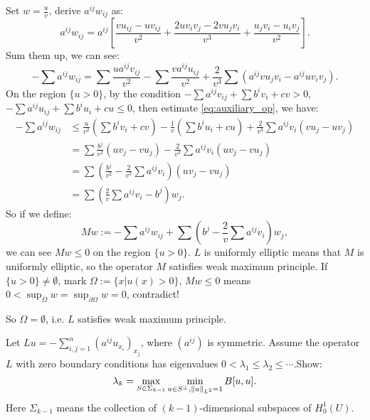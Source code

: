 \begin{solution}
    Set $w=\frac{u}{v}$, derive $a^{ij}w_{ij}$ as:
    \begin{equation}
        a^{ij}w_{ij}=a^{ij}\left[\frac{vu_{ij}-uv_{ij}}{v^2}+\frac{2uv_{i}v_{j}-2vu_{j}v_{i}}{v^3}+\frac{u_{j}v_{i}-u_{i}v_{j}}{v^2}\right].
    \end{equation}
    Sum them up, we can see:
    \begin{equation}
        \label{eq:auxiliary_op}
        -\sum a^{ij}w_{ij}=\sum\frac{ua^{ij}v_{ij}}{v^2}-\sum\frac{va^{ij}u_{ij}}{v^2}+\frac{2}{v^3}\sum\left(a^{ij}vu_{j}v_{i}-a^{ij}uv_{i}v_{j}\right).
    \end{equation}
    On the region $\{u>0\}$, by the condition $-\sum a^{ij}v_{ij}+\sum b^{i}v_{i}+cv>0$, $-\sum a^{ij}u_{ij}+\sum b^{i}u_{i}+cu\le 0$, then estimate \eqref{eq:auxiliary_op}, we have:
    \begin{equation}
        \begin{aligned}
            -\sum a^{ij}w_{ij}&\le \frac{u}{v^2}\left(\sum b^{i}v_{i}+cv\right)-\frac{1}{v}\left(\sum b^{i}u_{i}+cu\right)+\frac{2}{v^3}\sum a^{ij}v_{i}(vu_{j}-uv_{j})\\
            &=\sum \frac{b^{j}}{v^2}\left(uv_{j}-vu_{j}\right)-\frac{2}{v^{3}}\sum a^{ij}v_{i}\left(uv_{j}-vu_{j}\right)\\
            &=\sum\left(\frac{b^j}{v^2}-\frac{2}{v^3}\sum a^{ij}v_{i}\right)\left(uv_{j}-vu_{j}\right)\\
            &=\sum\left(\frac{2}{v}\sum a^{ij}v_{i}-b^{j}\right)w_{j}.
        \end{aligned}
    \end{equation} 
    So if we define:
    \begin{equation}
        Mw:=-\sum a^{ij}w_{ij}+\sum\left(b^{j}-\frac{2}{v}\sum a^{ij}v_{i}\right)w_{j},
    \end{equation}
    we can see $Mw\le 0$ on the region $\{u>0\}$. $L$ is uniformly elliptic means that $M$ is uniformly elliptic, so the operator $M$ satisfies weak maximum principle. If $\{u>0\}\neq\emptyset$, mark $\Omega:=\{x|u(x)>0\}$, $Mw\le 0$ means $0<\sup_{\bar{\Omega}}w=\sup_{\partial\Omega}w=0$, contradict!

    So $\Omega=\emptyset$, i.e. $L$ satisfies weak maximum principle.
\end{solution}
\begin{exercise}
    Let $Lu=-\sum_{i,j=1}^{n}\left(a^{ij}u_{x_{i}}\right)_{x_{j}}$, where $(a^{ij})$ is symmetric. Assume the operator $L$ with zero boundary conditions has eigenvalues $0<\lambda_{1}\le\lambda_{2}\le\cdots$.Show:
    \begin{equation}
        \label{eq:minimax}
        \lambda_{k}=\max_{S\in\Sigma_{k-1}}\min_{u\in S^{\bot},\left\|u\right\|_{L^{2}}=1}B[u,u].
    \end{equation}
    Here $\Sigma_{k-1}$ means the collection of $(k-1)$-dimensional subspaces of $H_{0}^{1}(U)$.
\end{exercise}

